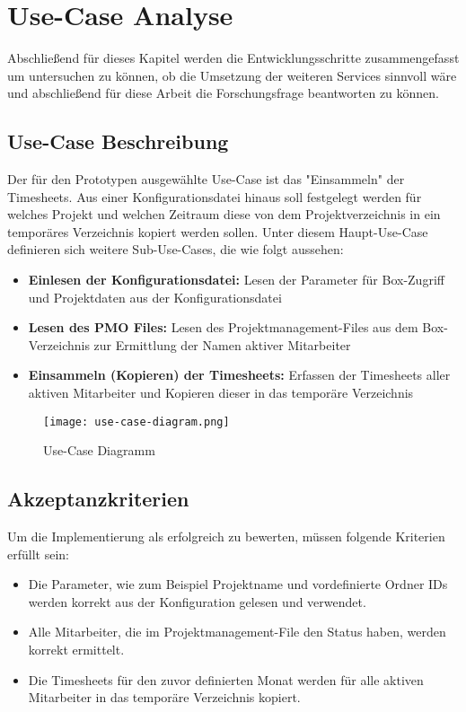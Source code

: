 \section{Use-Case Analyse}

Abschließend für dieses Kapitel werden die Entwicklungsschritte zusammengefasst um untersuchen zu können, ob die Umsetzung der weiteren Services sinnvoll wäre und abschließend für diese Arbeit die Forschungsfrage beantworten zu können.

\subsection{Use-Case Beschreibung}
Der für den Prototypen ausgewählte Use-Case ist das "Einsammeln" der Timesheets. Aus einer Konfigurationsdatei hinaus soll festgelegt werden für welches Projekt und welchen Zeitraum diese von dem Projektverzeichnis in ein temporäres Verzeichnis kopiert werden sollen. Unter diesem Haupt-Use-Case definieren sich weitere Sub-Use-Cases, die wie folgt aussehen:
\begin{itemize}
\item \textbf{Einlesen der Konfigurationsdatei:} Lesen der Parameter für Box-Zugriff und Projektdaten aus der Konfigurationsdatei
\item \textbf{Lesen des PMO Files:} Lesen des Projektmanagement-Files aus dem Box-Verzeichnis zur Ermittlung der Namen aktiver Mitarbeiter
\item \textbf{Einsammeln (Kopieren) der Timesheets:} Erfassen der Timesheets aller aktiven Mitarbeiter und Kopieren dieser in das temporäre Verzeichnis
\end{itemize}

\begin{figure}[H]
    \centering
    \texttt{[image: use-case-diagram.png]}
    \caption{Use-Case Diagramm}
    \label{fig:use-case-diagram}
\end{figure}

\subsection{Akzeptanzkriterien}
Um die Implementierung als erfolgreich zu bewerten, müssen folgende Kriterien erfüllt sein:
\begin{itemize}
\item Die Parameter, wie zum Beispiel Projektname und vordefinierte Ordner IDs werden korrekt aus der Konfiguration gelesen und verwendet.
\item Alle Mitarbeiter, die im Projektmanagement-File den Status \grqq{} haben, werden korrekt ermittelt.
\item Die Timesheets für den zuvor definierten Monat werden für alle aktiven Mitarbeiter in das temporäre Verzeichnis kopiert.
\end{itemize}

